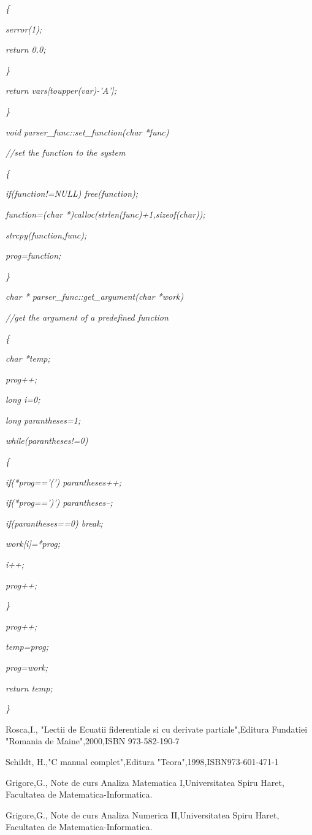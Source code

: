 \documentclass[a4paper,twoside]{book}
\begin{document}
\textit{\qquad \{}

\textit{\qquad \qquad serror(1);}

\textit{\qquad \qquad return 0.0;}

\textit{\qquad \}}

\textit{\qquad return vars[toupper(var)-'A'];}

\textit{\}}

\textit{void parser\_func::set\_function(char *func)}

\textit{//set the function to the system}

\textit{\{}

\textit{\qquad if(function!=NULL) free(function);}

\textit{\qquad function=(char *)calloc(strlen(func)+1,sizeof(char));}

\textit{\qquad strcpy(function,func);}

\textit{\qquad prog=function;}

\textit{\}}

\textit{char * parser\_func::get\_argument(char *work)}

\textit{//get the argument of a predefined function}

\textit{\{}

\textit{\qquad char *temp;}

\textit{\qquad prog++;}

\textit{\qquad long i=0;}

\textit{\qquad long parantheses=1;}

\textit{\qquad while(parantheses!=0)}

\textit{\qquad \{}

\textit{\qquad \qquad if(*prog=='(') parantheses++;}

\textit{\qquad \qquad if(*prog==')') parantheses--;}

\textit{\qquad \qquad if(parantheses==0) break;}

\textit{\qquad \qquad work[i]=*prog;}

\textit{\qquad \qquad i++;}

\textit{\qquad \qquad prog++;}

\textit{\qquad \}}

\textit{\qquad prog++;}

\textit{\qquad temp=prog;}

\textit{\qquad prog=work;}

\textit{\qquad return temp;}

\textit{\}}

\begin{thebibliography}{9}
 Rosca,I., "Lectii de Ecuatii fiderentiale si cu derivate
partiale",Editura Fundatiei "Romania de Maine",2000,ISBN 973-582-190-7

 Schildt, H.,"C manual complet",Editura
"Teora",1998,ISBN973-601-471-1

 Grigore,G., Note de curs Analiza Matematica
I,Universitatea Spiru Haret, Facultatea de Matematica-Informatica.

 Grigore,G., Note de curs Analiza Numerica II,Universitatea
Spiru Haret, Facultatea de Matematica-Informatica.
\end{thebibliography}
\end{document}
